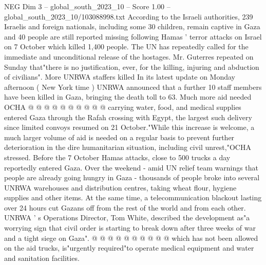 \begin{textsample}{NEG Dim 3 – global\_south\_2023\_10 – Score 1.00 – global\_south\_2023\_10/103088998.txt}
According to the Israeli authorities, 239 Israelis and foreign nationals, including some 30 children, remain captive in Gaza and 40 people are still reported missing following Hamas ' terror attacks on Israel on 7 October which killed 1,400 people.
The UN has repeatedly called for the immediate and unconditional release of the hostages.
Mr.
Guterres repeated on Sunday that"there is no justification, ever, for the killing, injuring and abduction of civilians".
More UNRWA staffers killed In its latest update on Monday afternoon ( New York time ) UNRWA announced that a further 10 staff members have been killed in Gaza, bringing the death toll to 63.
Much more aid needed OCHA @ @ @ @ @ @ @ @ @ @ carrying water, food, and medical supplies entered Gaza through the Rafah crossing with Egypt, the largest such delivery since limited convoys resumed on 21 October."While this increase is welcome, a much larger volume of aid is needed on a regular basis to prevent further deterioration in the dire humanitarian situation, including civil unrest,"OCHA stressed.
Before the 7 October Hamas attacks, close to 500 trucks a day reportedly entered Gaza.
Over the weekend - amid UN relief team warnings that people are already going hungry in Gaza - thousands of people broke into several UNRWA warehouses and distribution centres, taking wheat flour, hygiene supplies and other items.
At the same time, a telecommunication blackout lasting over 24 hours cut Gazans off from the rest of the world and from each other.
UNRWA ' s Operations Director, Tom White, described the development as"a worrying sign that civil order is starting to break down after three weeks of war and a tight siege on Gaza". @ @ @ @ @ @ @ @ @ @ which has not been allowed on the aid trucks, is"urgently required"to operate medical equipment and water and sanitation facilities.

\end{textsample}
